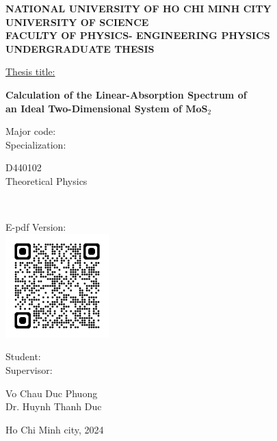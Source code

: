\documentclass[12pt,english,a4paper]{article}
\begin{document}
	\begin{titlepage}
		\begin{center}
			{\large \textbf{NATIONAL UNIVERSITY OF HO CHI MINH CITY}\\\textbf{UNIVERSITY OF SCIENCE}\\}
			{ \textbf{FACULTY OF PHYSICS- ENGINEERING PHYSICS}}\\[2cm]
			
			
			{ \large \bfseries UNDERGRADUATE THESIS\\[2	cm] } 
		\end{center}
		\underline{Thesis title:}
		\begin{center}
			{ \Large \bfseries Calculation of the Linear-Absorption Spectrum of\\ an Ideal Two-Dimensional System of $\mathrm{\textbf{MoS}}_2$\\[1cm]} 
		\end{center}
		\parbox{3cm}{Major code:\\ Specialization:}\parbox{5cm}{D440102\\Theoretical Physics}\\[1cm]
		\begin{center}
			\parbox{5cm}{\centering E-pdf Version:\\ %
				\includegraphics[width=4cm]{images/qrgithub.png}}\hfill\parbox{3cm}{Student:\\
				Supervisor:}\parbox{6cm}{Vo Chau Duc Phuong\\Dr. Huynh Thanh Duc}
			\vfill
			Ho Chi Minh city, 2024
		\end{center}
	\end{titlepage}
%			
%			
%			
\end{document}
